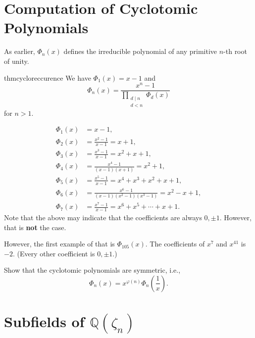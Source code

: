 \section{Computation of Cyclotomic Polynomials}
As earlier, $\Phi_n(x)$ defines the irreducible polynomial of any primitive $n$-th root of unity.

\begin{restatable}[]{thm}{cycloreccurence}
\label{thm:cycloreccurence}
    We have $\Phi_1(x) = x - 1$ and
    \begin{equation*} 
        \Phi_n(x) = \frac{x^n - 1}{\displaystyle\prod_{\substack{d \mid n\\ d < n}} \Phi_d(x)}
    \end{equation*}
    for $n > 1.$ \hfill\hyperref[thm:cycloreccurence2]{\downsym}
\end{restatable}

\begin{ex}
    \begin{align*} 
        \Phi_1(x) &= x - 1, \\
        \Phi_2(x) &= \frac{x^2 - 1}{x - 1} = x + 1, \\
        \Phi_3(x) &= \frac{x^3 - 1}{x - 1} = x^2 + x + 1, \\
        \Phi_4(x) &= \frac{x^4 - 1}{(x - 1)(x + 1)} = x^2 + 1, \\
        \Phi_5(x) &= \frac{x^5 - 1}{x - 1} = x^4 + x^3 + x^2 + x + 1, \\
        \Phi_6(x) &= \frac{x^6 - 1}{(x - 1)(x^2 - 1)(x^3 - 1)} = x^2 - x + 1, \\
        \Phi_7(x) &= \frac{x^7 - 1}{x - 1} = x^6 + x^5 + \cdots + x + 1.
    \end{align*}
    Note that the above may indicate that the coefficients are always $0, \pm 1.$ However, that is \textbf{not} the case.

    However, the first example of that is $\Phi_{105}(x).$ The coefficients of $x^7$ and $x^{41}$ is $-2.$ (Every other coefficient is $0, \pm 1.$)
\end{ex}

\begin{exe}
    Show that the cyclotomic polynomials are symmetric, i.e.,
    \begin{equation*} 
        \Phi_n(x) = x^{\varphi(n)}\Phi_n\left(\frac{1}{x}\right).
    \end{equation*}
\end{exe}

\section{Subfields of \texorpdfstring{$\mathbb{Q}(\zeta_n)$}{Q(zn)}}


